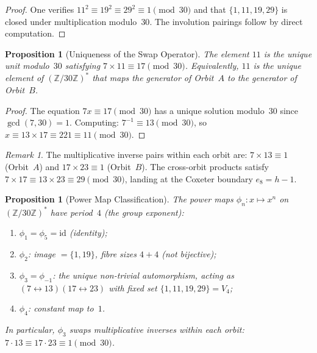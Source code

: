 \documentclass[11pt]{amsart}
\theoremstyle{plain}
\newtheorem{proposition}[theorem]{Proposition}
\theoremstyle{definition}
\theoremstyle{remark}
\newtheorem{remark}[theorem]{Remark}
\begin{document}
\begin{proof}
One verifies $11^2 \equiv 19^2 \equiv 29^2 \equiv 1 \pmod{30}$ and
that $\{1,11,19,29\}$ is closed under multiplication modulo~$30$.
The involution pairings follow by direct computation.
\end{proof}

\begin{proposition}[Uniqueness of the Swap Operator]\label{prop:N-uniqueness}
The element $11$ is the unique unit modulo~$30$ satisfying
$7 \times 11 \equiv 17 \pmod{30}$.  Equivalently, $11$ is the unique
element of $(\mathbb{Z}/30\mathbb{Z})^*$ that maps the generator of
Orbit~$A$ to the generator of Orbit~$B$.
\end{proposition}

\begin{proof}
The equation $7x \equiv 17 \pmod{30}$ has a unique solution modulo~$30$
since $\gcd(7,30)=1$.  Computing: $7^{-1} \equiv 13 \pmod{30}$, so
$x \equiv 13 \times 17 \equiv 221 \equiv 11 \pmod{30}$.
\end{proof}

\begin{remark}\label{rem:inverse-pairs}
The multiplicative inverse pairs within each orbit are:
$7 \times 13 \equiv 1$ (Orbit~$A$) and $17 \times 23 \equiv 1$
(Orbit~$B$).  The cross-orbit products satisfy
$7 \times 17 \equiv 13 \times 23 \equiv 29 \pmod{30}$,
landing at the Coxeter boundary $e_8 = h - 1$.
\end{remark}

\begin{proposition}[Power Map Classification]\label{prop:power-maps}
The power maps $\phi_n \colon x \mapsto x^n$ on $(\mathbb{Z}/30\mathbb{Z})^*$
have period~$4$ (the group exponent):
\begin{enumerate}[\upshape(i)]
  \item $\phi_1 = \phi_5 = \mathrm{id}$ (identity);
  \item $\phi_2$: image $= \{1, 19\}$, fibre sizes $4 + 4$ (not bijective);
  \item $\phi_3 = \phi_{-1}$: the unique non-trivial automorphism,
    acting as $(7 \leftrightarrow 13)(17 \leftrightarrow 23)$ with
    fixed set $\{1, 11, 19, 29\} = V_4$;
  \item $\phi_4$: constant map to~$1$.
\end{enumerate}
In particular, $\phi_3$ swaps multiplicative inverses within each orbit:
$7 \cdot 13 \equiv 17 \cdot 23 \equiv 1 \pmod{30}$.
\end{proposition}
\end{document}
